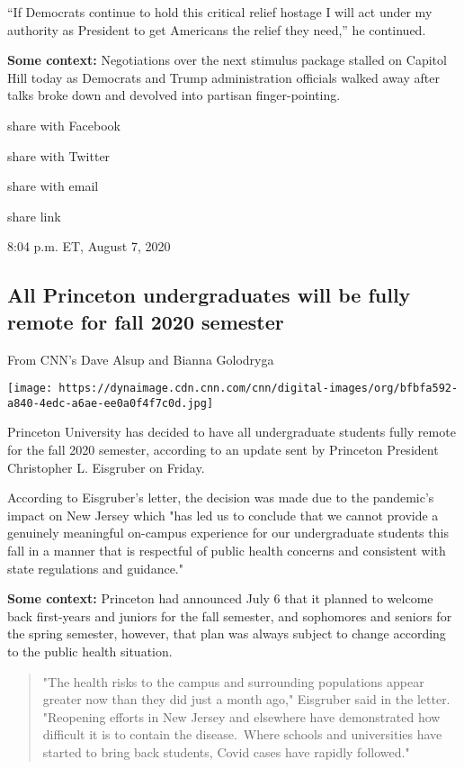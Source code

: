 ``If Democrats continue to hold this critical relief hostage I will act
under my authority as President to get Americans the relief they need,''
he continued.

\textbf{Some context:} Negotiations over the next stimulus package
stalled on Capitol Hill today as Democrats and Trump administration
officials walked away after talks broke down and devolved into partisan
finger-pointing.~

share with Facebook

share with Twitter

share with email

share link

8:04 p.m. ET, August 7, 2020

\hypertarget{all-princeton-undergraduates-will-be-fully-remote-for-fall-2020-semester}{%
\subsection{All Princeton undergraduates will be fully remote for fall
2020
semester}\label{all-princeton-undergraduates-will-be-fully-remote-for-fall-2020-semester}}

From CNN's Dave Alsup and Bianna Golodryga

\texttt{[image: https://dynaimage.cdn.cnn.com/cnn/digital-images/org/bfbfa592-a840-4edc-a6ae-ee0a0f4f7c0d.jpg]}

Princeton University has decided to have all undergraduate students
fully remote for the fall 2020 semester, according to an update sent by
Princeton President Christopher L. Eisgruber on Friday.

According to Eisgruber's letter, the decision was made due to the
pandemic's impact on New Jersey which "has led us to conclude that we
cannot provide a genuinely meaningful on-campus experience for our
undergraduate students this fall in a manner that is respectful of
public health concerns and consistent with state regulations and
guidance."

\textbf{Some context:} Princeton had announced July 6 that it planned to
welcome back first-years and juniors for the fall semester, and
sophomores and seniors for the spring semester, however, that plan was
always subject to change according to the public health situation.

\begin{quote}
"The health risks to the campus and surrounding populations appear
greater now than they did just a month ago," Eisgruber said in the
letter. "Reopening efforts in New Jersey and elsewhere have demonstrated
how difficult it is to contain the disease.~Where schools and
universities have started to bring back students, Covid cases have
rapidly followed."
\end{quote}


